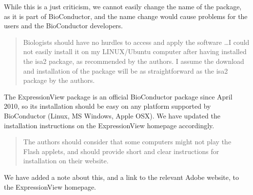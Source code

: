 \documentclass[a4paper]{article}
\newenvironment{myquote}{\begin{quote}\color{blue}}{\end{quote}}
\begin{document}
While this is a just criticism, we cannot easily change the name of the
package, as it is part of BioConductor, and the name change would
cause problems for the users and the BioConductor developers.

\begin{myquote}
Biologists should have no hurdles to access and apply the software
\ldots I could not easily install it on my LINUX/Ubuntu computer after
having installed the isa2 package, as recommended by the authors. 
I assume the download and installation of the package will be as
straightforward as the isa2 package by the authors.
\end{myquote}

The ExpressionView package is an official BioConductor package since
April 2010, so its installation should be easy on any platform
supported by BioConductor (Linux, MS Windows, Apple OSX). We have
updated the installation instructions on the ExpressionView homepage
accordingly.

\begin{myquote}
The authors should consider that some computers might not play the
Flash applets, and should provide short and clear instructions for
installation on their website.
\end{myquote}

We have added a note about this, and a link to the relevant Adobe
website, to the ExpressionView homepage.



\end{document}
